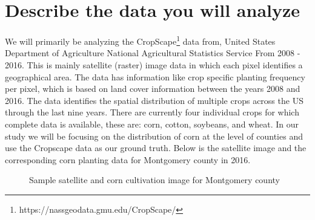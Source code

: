 \documentclass[10pt,letterpaper]{article}
\begin{document}
\section{Describe the data you will analyze}
We will primarily be analyzing the CropScape\footnote{https://nassgeodata.gmu.edu/CropScape/} data from, United States Department of Agriculture
National Agricultural Statistics Service From 2008 - 2016. This is mainly satellite (raster) image data in which each pixel identifies a geographical area. The data has information like crop specific planting frequency per pixel, which is based on land cover information between the years 2008 and 2016. The data identifies the spatial distribution of multiple crops across the US through the last nine years. There are currently four individual crops for which complete data is available, these are: corn, cotton, soybeans, and wheat. In our study we will be focusing on the distribution of corn at the level of counties and use the Cropscape data as our ground truth. Below is the satellite image and the corresponding corn planting data for Montgomery county in 2016. 

\begin{figure}[ht]
\hfill
{}
\hfill
{}
\hfill \hfill
\caption{Sample satellite and corn cultivation image for Montgomery county}
\end{figure}
\end{document}
